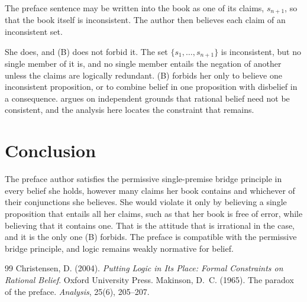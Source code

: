 \documentclass{situationist-preprint}
\begin{document}
\begin{objection}
The preface sentence may be written into the book as one of its claims, $s_{n+1}$, so that the book itself is inconsistent. The author then believes each claim of an inconsistent set.
\end{objection}

\begin{reply}
She does, and (B) does not forbid it. The set $\{s_1, \ldots, s_{n+1}\}$ is inconsistent, but no single member of it is, and no single member entails the negation of another unless the claims are logically redundant. (B) forbids her only to believe one inconsistent proposition, or to combine belief in one proposition with disbelief in a consequence. \citet{Christensen2004} argues on independent grounds that rational belief need not be consistent, and the analysis here locates the constraint that remains.
\end{reply}

\section{Conclusion}

The preface author satisfies the permissive single-premise bridge principle in every belief she holds, however many claims her book contains and whichever of their conjunctions she believes. She would violate it only by believing a single proposition that entails all her claims, such as that her book is free of error, while believing that it contains one. That is the attitude that is irrational in the case, and it is the only one (B) forbids. The preface is compatible with the permissive bridge principle, and logic remains weakly normative for belief.

\begin{thebibliography}{99}\small
{} Christensen, D. (2004). \emph{Putting Logic in Its Place: Formal Constraints on Rational Belief}. Oxford University Press.
 Makinson, D.~C. (1965). The paradox of the preface. \emph{Analysis}, 25(6), 205--207.
\end{thebibliography}
\end{document}
